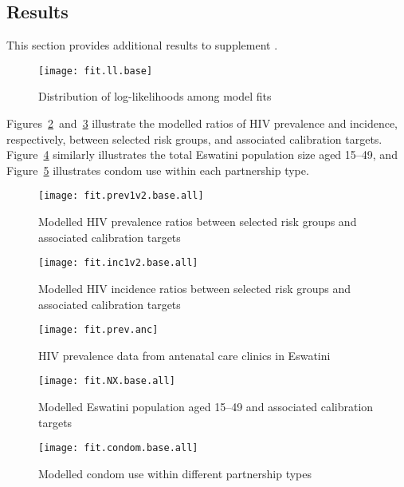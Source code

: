 \subsection{Results}\label{app.model.cal.res}
This section provides additional results to supplement .
\begin{figure}[h]
  \centering\texttt{[image: fit.ll.base]}
  \caption{Distribution of log-likelihoods among model fits}
  \label{fig:fit.ll}
\end{figure}
\par
Figures~\ref{fig:fit.prev1v2}~and~\ref{fig:fit.inc1v2}
illustrate the modelled ratios of HIV prevalence and incidence, respectively,
between selected risk groups, and associated calibration targets.
Figure~\ref{fig:fit.pop} similarly illustrates the total Eswatini population size aged 15--49, and
Figure~\ref{fig:fit.condom} illustrates condom use within each partnership type.
\begin{figure}[h]
  \centering\texttt{[image: fit.prev1v2.base.all]}
  \caption{Modelled HIV prevalence ratios between selected risk groups
    and associated calibration targets}
  \label{fig:fit.prev1v2}
\end{figure}
\begin{figure}[h]
  \centering\texttt{[image: fit.inc1v2.base.all]}
  \caption{Modelled HIV incidence ratios between selected risk groups
    and associated calibration targets}
  \label{fig:fit.inc1v2}
\end{figure}
\begin{figure}[h]
  \begin{minipage}[t]{.54\linewidth}
    \centering\texttt{[image: fit.prev.anc]}
    \caption{HIV prevalence data from antenatal care clinics in Eswatini}
    \label{fig:fit.prev.anc}
  \end{minipage}\hfill
  \begin{minipage}[t]{.44\linewidth}
    \centering\texttt{[image: fit.NX.base.all]}
    \caption{Modelled Eswatini population aged 15--49
    and associated calibration targets}
    \label{fig:fit.pop}
  \end{minipage}
\end{figure}
\begin{figure}[h]
  \centering\texttt{[image: fit.condom.base.all]}
  \caption{Modelled condom use within different partnership types}
  \label{fig:fit.condom}
\end{figure}
